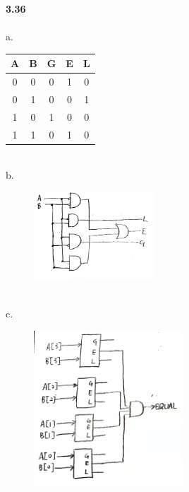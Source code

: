 \documentclass[a4paper,12pt]{article}     %
\begin{document}
\newpage
\textbf{3.36}\\
~\\
a. \
\begin{tabular}{c c|c c c}
  \hline
  A & B & G & E & L \\
  \hline
  0 & 0 & 0 & 1 & 0 \\
  0 & 1 & 0 & 0 & 1 \\
  1 & 0 & 1 & 0 & 0 \\
  1 & 1 & 0 & 1 & 0 \\
  \hline
\end{tabular}\\

b. \ \begin{figure}[h] \includegraphics[width = 0.4\textwidth]{fig/fig4.jpeg} \end{figure}\\

c. \ \begin{figure}[h] \includegraphics[width = 0.5\textwidth]{fig/fig5.jpeg} \end{figure}
\end{document}
